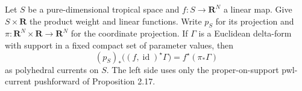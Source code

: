 \begin{lemma}
\label{r11p:tropical-product-push}
Let $S$ be a pure-dimensional tropical space and
$f:S\to\mathbf R^N$ a linear map.  Give $S\times\mathbf R$ the
product weight and linear functions.  Write $p_S$ for its projection
and $\pi:\mathbf R^N\times\mathbf R\to\mathbf R^N$ for the coordinate
projection.  If $\Gamma$ is a Euclidean delta-form with support in
a fixed compact set of parameter values, then
\[
 (p_S)_*\bigl((f,\operatorname{id})^\star\Gamma\bigr)
                                      =f^\star(\pi_*\Gamma)
\tag{PS2}\label{r11p:tropical-product-push-identity}
\]
as polyhedral currents on $S$.  The left side uses only the
proper-on-support pwl-current pushforward of Proposition 2.17.
\end{lemma}

